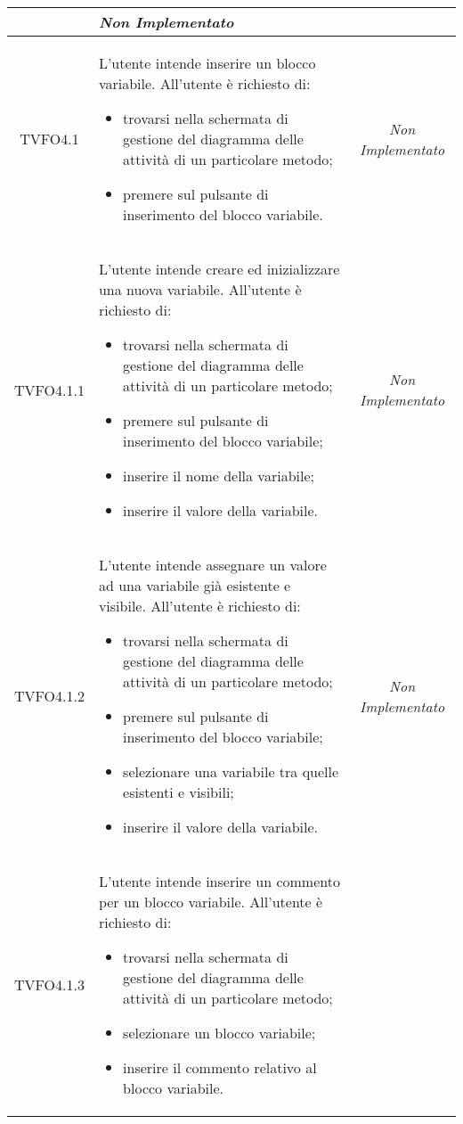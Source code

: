 \begin{longtable}{|c|>{}m{8cm}|c|}
\begin{itemize}
\end{itemize} & \textit{Non Implementato}\\ \hline
\hypertarget{TVFO4.1}{TVFO4.1} & L'utente intende inserire un blocco variabile.
All'utente è richiesto di:
\begin{itemize}
	\item trovarsi nella schermata di gestione del diagramma delle attività di un particolare metodo;
	\item premere sul pulsante di inserimento del blocco variabile.
\end{itemize} & \textit{Non Implementato}\\ \hline
\hypertarget{TVFO4.1.1}{TVFO4.1.1} & L'utente intende creare ed inizializzare una nuova variabile.
All'utente è richiesto di:
\begin{itemize}
	\item trovarsi nella schermata di gestione del diagramma delle attività di un particolare metodo;
	\item premere sul pulsante di inserimento del blocco variabile;
	\item inserire il nome della variabile;
	\item inserire il valore della variabile.
\end{itemize} & \textit{Non Implementato}\\ \hline
\hypertarget{TVFO4.1.2}{TVFO4.1.2} & L'utente intende assegnare un valore ad una variabile già esistente e visibile.
All'utente è richiesto di:
\begin{itemize}
	\item trovarsi nella schermata di gestione del diagramma delle attività di un particolare metodo;
	\item premere sul pulsante di inserimento del blocco variabile;
	\item selezionare una variabile tra quelle esistenti e visibili;
	\item inserire il valore della variabile.
\end{itemize} & \textit{Non Implementato}\\ \hline
\hypertarget{TVFO4.1.3}{TVFO4.1.3} & L'utente intende inserire un commento per un blocco variabile.
All'utente è richiesto di:
\begin{itemize}
	\item trovarsi nella schermata di gestione del diagramma delle attività di un particolare metodo;
	\item selezionare un blocco variabile;
	\item inserire il commento relativo al blocco variabile.

\end{itemize}
\end{longtable}
